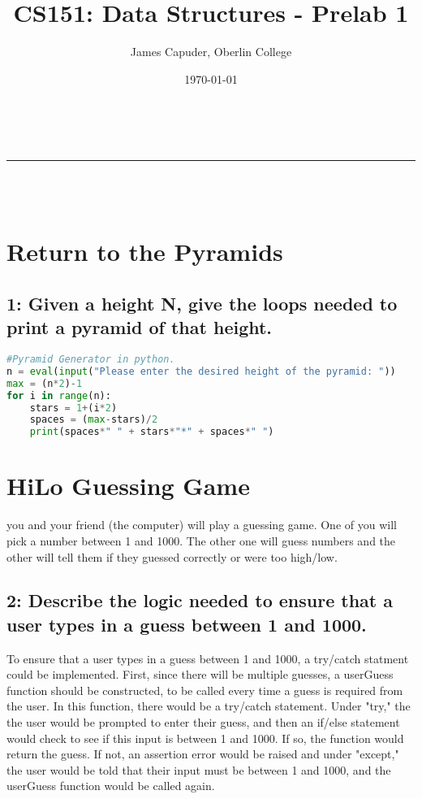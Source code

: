 \documentclass[a4paper,11pt]{article}
\makeatletter
\newcommand{\linia}{\rule{\linewidth}{0.5pt}}
\theoremstyle{mytheor}
\renewcommand{\maketitle}{
\begin{center}
\vspace{2ex}
{\huge \textsc{\@title}}
\vspace{1ex}
\\
\linia\\
\@author \hfill \@date\
\vspace{4ex}
\end{center}
}
\makeatother
\begin{document}
\title{CS151: Data Structures - Prelab 1}

\author{James Capuder, Oberlin College}

\date{\today}

\maketitle

\section*{Return to the Pyramids}
\subsection*{1: Given a height N, give the loops needed to print a pyramid of that height.}
\begin{lstlisting}[language=Python]
#Pyramid Generator in python.
n = eval(input("Please enter the desired height of the pyramid: "))
max = (n*2)-1
for i in range(n):
    stars = 1+(i*2)
    spaces = (max-stars)/2
    print(spaces*" " + stars*"*" + spaces*" ")
\end{lstlisting}

\section*{HiLo Guessing Game}
\begin{center}
you and your friend (the computer) will play a guessing game. One of you will pick a number between 1 and 1000. The other one will guess numbers and the other will tell them if they guessed correctly or were too high/low.
\end{center}

\subsection*{2: Describe the logic needed to ensure that a user types in a guess between 1 and 1000.}
To ensure that a user types in a guess between 1 and 1000, a try/catch statment could be implemented. First, since there will be multiple guesses, a userGuess function should be constructed, to be called every time a guess is required from the user. In this function, there would be a try/catch statement. Under "try," the the user would be prompted to enter their guess, and then an if/else statement would check to see if this input is between 1 and 1000. If so, the function would return the guess. If not, an assertion error would be raised and under "except," the user would be told that their input must be between 1 and 1000, and the userGuess function would be called again.
\end{document}
